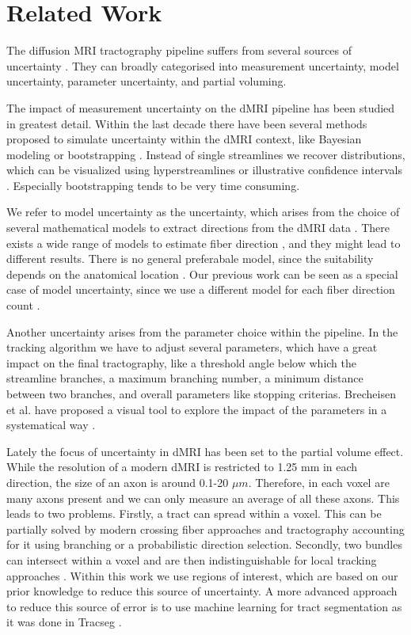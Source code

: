 \section{Related Work}\label{related}
The diffusion MRI tractography pipeline suffers from several sources of
uncertainty \cite{Schultz:SciVisBook2014, Schultz:NBM2018, Gillmann:STAR2021}.
They can broadly categorised into measurement uncertainty,
model uncertainty, parameter uncertainty, and partial voluming. 

The impact of measurement
uncertainty on the dMRI pipeline has been studied in greatest detail. Within the last
decade there have been several methods proposed to simulate uncertainty within
the dMRI context, like Bayesian modeling \cite{BEHRENS2007144} or bootstrapping
\cite{Chung:2006}. Instead of single streamlines we recover distributions,
which can be visualized using hyperstreamlines \cite{Jeurissen:2012, Wiens:2014}
or illustrative confidence intervals \cite{Brecheisen:2013}. Especially
bootstrapping tends to be very time consuming.

We refer to model uncertainty as the uncertainty, which arises from the choice
of several mathematical models to extract directions from the dMRI data
\cite{Schultz:SciVisBook2014}. There exists a wide range of models to estimate
fiber direction \cite{Panagiotaki:2012}, and they might lead to different
results. There is no general preferabale model, since the suitability depends  on
the anatomical location \cite{Bretthorst:2004,Freidlin:2007}. Our previous work
can be seen as a special case of model uncertainty, since we use a different model
for each fiber direction count \cite{Gruen:2021}. 

Another uncertainty arises from the parameter choice within the pipeline. In the
tracking algorithm we have to adjust several parameters, which have a great
impact on the final tractography, like a threshold angle below which the streamline
branches, a maximum branching number, a minimum distance between two branches,
and overall parameters like stopping criterias. Brecheisen et al. have proposed
a visual
tool to explore the impact of the parameters in a systematical way
\cite{Brecheisen:2009}.

Lately the focus of uncertainty in dMRI has been set to the partial volume
effect. While the resolution of a modern dMRI is restricted to 1.25 mm in each
direction, the size of an axon is around 0.1-20 $\mu m$. Therefore, in each voxel
are many axons present and we can only measure an average of all these axons.
This leads to two problems. Firstly, a tract can spread within a voxel. This can
be partially solved by modern crossing fiber approaches and
tractography accounting for it using branching or a probabilistic direction
selection.
Secondly, two bundles can intersect
within a voxel and are then indistinguishable for local tracking approaches
\cite{Schilling:2022}. Within this work we use regions of interest, which are
based on our prior knowledge to reduce this source of uncertainty. A more
advanced approach to reduce this source of error is to use machine learning for
tract segmentation as it was done in Tracseg \cite{WASSERTHAL2018239}.


